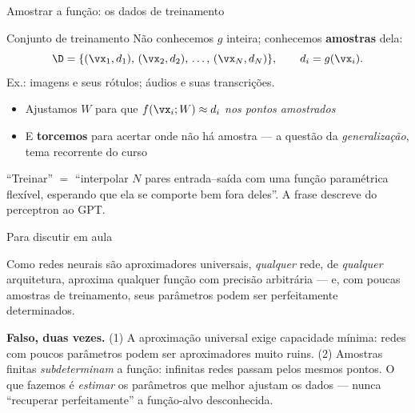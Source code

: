 \documentclass[aspectratio=169, 11pt]{beamer}
\begin{document}
\begin{frame}{Amostrar a função: os dados de treinamento}
  \begin{defbox}{Conjunto de treinamento}
    Não conhecemos $g$ inteira; conhecemos \textbf{amostras} dela:
    \[
      \D = \{(\vx_1, d_1),\, (\vx_2, d_2),\, \ldots,\, (\vx_N, d_N)\},
      \qquad d_i = g(\vx_i).
    \]
    Ex.: imagens e seus rótulos; áudios e suas transcrições.
  \end{defbox}

  \begin{itemize}\setlength{\itemsep}{0.3ex}
    \item Ajustamos $W$ para que $f(\vx_i; W) \approx d_i$ \emph{nos pontos amostrados}
    \item E \textbf{torcemos} para acertar onde não há amostra —
          a questão da \emph{generalização}, tema recorrente do curso
  \end{itemize}

  \begin{ideiabox}
    ``Treinar'' $=$ ``interpolar $N$ pares entrada--saída com uma função
    paramétrica flexível, esperando que ela se comporte bem fora deles''.
    A frase descreve do perceptron ao GPT.
  \end{ideiabox}
\end{frame}

\begin{frame}{Para discutir em aula}
  \begin{quizbox}
    Como redes neurais são aproximadores universais, \emph{qualquer} rede, de
    \emph{qualquer} arquitetura, aproxima qualquer função com precisão
    arbitrária — e, com poucas amostras de treinamento, seus parâmetros podem
    ser perfeitamente determinados.

    \smallskip
  \end{quizbox}

  \pause

  \begin{respbox}
    \textbf{Falso, duas vezes.} (1) A aproximação universal exige
    \alert{capacidade mínima}: redes com poucos parâmetros podem ser
    aproximadores muito ruins. (2) Amostras finitas \emph{subdeterminam} a
    função: infinitas redes passam pelos mesmos pontos. O que fazemos é
    \emph{estimar} os parâmetros que melhor ajustam os dados — nunca
    ``recuperar perfeitamente'' a função-alvo desconhecida.
  \end{respbox}
\end{frame}
\end{document}
